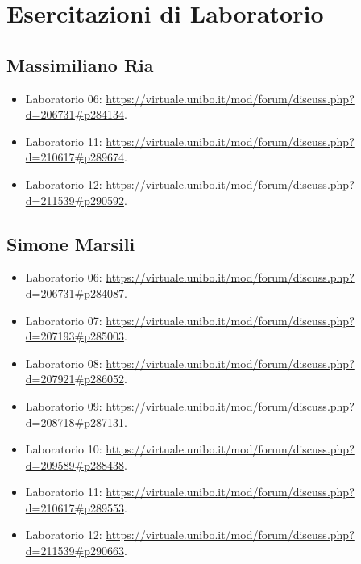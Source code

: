 \chapter{Esercitazioni di Laboratorio}

\section{Massimiliano Ria}

\begin{itemize}
    \item Laboratorio 06: \url{https://virtuale.unibo.it/mod/forum/discuss.php?d=206731#p284134}.
    \item Laboratorio 11: \url{https://virtuale.unibo.it/mod/forum/discuss.php?d=210617#p289674}.
    \item Laboratorio 12: \url{https://virtuale.unibo.it/mod/forum/discuss.php?d=211539#p290592}.
\end{itemize}

\section{Simone Marsili}

\begin{itemize}
    \item Laboratorio 06: \url{https://virtuale.unibo.it/mod/forum/discuss.php?d=206731#p284087}.
    \item Laboratorio 07: \url{https://virtuale.unibo.it/mod/forum/discuss.php?d=207193#p285003}.
    \item Laboratorio 08: \url{https://virtuale.unibo.it/mod/forum/discuss.php?d=207921#p286052}.
    \item Laboratorio 09: \url{https://virtuale.unibo.it/mod/forum/discuss.php?d=208718#p287131}.
    \item Laboratorio 10: \url{https://virtuale.unibo.it/mod/forum/discuss.php?d=209589#p288438}.
    \item Laboratorio 11: \url{https://virtuale.unibo.it/mod/forum/discuss.php?d=210617#p289553}.
    \item Laboratorio 12: \url{https://virtuale.unibo.it/mod/forum/discuss.php?d=211539#p290663}.
\end{itemize}
